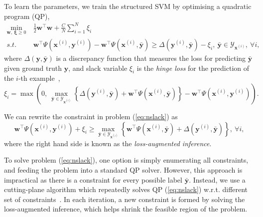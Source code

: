 To learn the parameters, we train the structured SVM by optimising a quadratic program (QP),
\begin{equation}
\label{eq:nslack}
\begin{aligned}
\min_{\mathbf{w}, ~\bm{\xi} \ge 0} ~& \frac{1}{2} \mathbf{w}^\top \mathbf{w} + \frac{C}{N} \sum_{i=1}^N \xi_i \\
s.t.~~ ~& \mathbf{w}^\top \Psi(\mathbf{x}^{(i)}, \mathbf{y}^{(i)}) - \mathbf{w}^\top \Psi(\mathbf{x}^{(i)}, \bar{\mathbf{y}}) \ge 
       \Delta(\mathbf{y}^{(i)}, \bar{\mathbf{y}}) - \xi_i, ~\bar{\mathbf{y}} \in \mathcal{Y}_{\mathbf{x}^{(i)}},~\forall i,
\end{aligned}
\end{equation}
where $\Delta(\mathbf{y}, \bar{\mathbf{y}})$ is a discrepancy function that measures the loss 
for predicting $\bar{\mathbf{y}}$ given ground truth $\mathbf{y}$, 
and slack variable $\xi_i$ is the \emph{hinge loss} for the prediction of the $i$-th example~\cite{tsochantaridis2005large},
\begin{equation*}
\xi_i = \max \left( 0,~ 
        \max_{\bar{\mathbf{y}} \in \mathcal{Y}_{\mathbf{x}^{(i)}}} 
        \left\{ \Delta(\mathbf{y}^{(i)}, \bar{\mathbf{y}}) + \mathbf{w}^\top \Psi(\mathbf{x}^{(i)}, \bar{\mathbf{y}}) \right\} -
        \mathbf{w}^\top \Psi(\mathbf{x}^{(i)}, \mathbf{y}^{(i)}) \right).
\end{equation*}

We can rewrite the constraint in problem (\ref{eq:nslack}) as
\begin{equation}
\label{eq:ssvminf}
\mathbf{w}^\top \Psi(\mathbf{x}^{(i)}, \mathbf{y}^{(i)}) + \xi_i \ge
          \max_{\bar{\mathbf{y}} \in \mathcal{Y}_{\mathbf{x}^{(i)}}}
          \left\{\mathbf{w}^\top \Psi(\mathbf{x}^{(i)}, \bar{\mathbf{y}}) + \Delta(\mathbf{y}^{(i)}, \bar{\mathbf{y}}) \right\},~ \forall i,
\end{equation}
where the right hand side is known as the \emph{loss-augmented inference}.

To solve problem (\ref{eq:nslack}), one option is simply enumerating all constraints, and feeding the problem into a standard QP solver.
However, this approach is impractical as there is a constraint for every possible label $\bar{\mathbf{y}}$.
Instead, we use a cutting-plane algorithm which repeatedly solves QP (\ref{eq:nslack}) 
w.r.t. different set of constraints~\cite{joachims2009predicting}.
In each iteration, a new constraint is formed by solving the loss-augmented inference, 
which helps shrink the feasible region of the problem.

